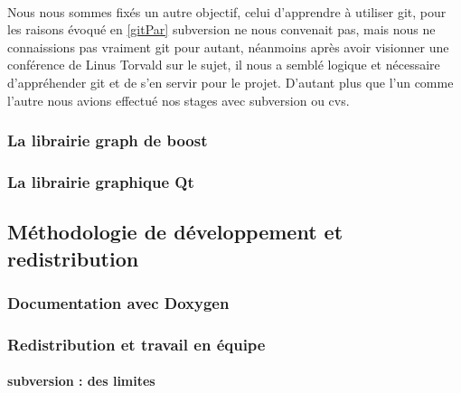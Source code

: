 \paragraph{} Nous nous sommes fixés un autre objectif, celui d'apprendre à utiliser git, pour les raisons évoqué en \ref{gitPar} subversion ne nous convenait pas, mais nous ne connaissions pas vraiment git pour autant, néanmoins après avoir visionner une conférence de Linus Torvald  %
sur le sujet, il nous a semblé logique et nécessaire d'appréhender git et de s'en servir pour le projet. D'autant plus que l'un comme l'autre nous avions effectué nos stages avec subversion ou cvs.

\subsubsection{La librairie graph de boost}



\subsubsection{La librairie graphique Qt}


\subsection{Méthodologie de développement et redistribution}
\subsubsection{Documentation avec Doxygen}

\subsubsection{Redistribution et travail en équipe}
\paragraph{subversion : des limites}

